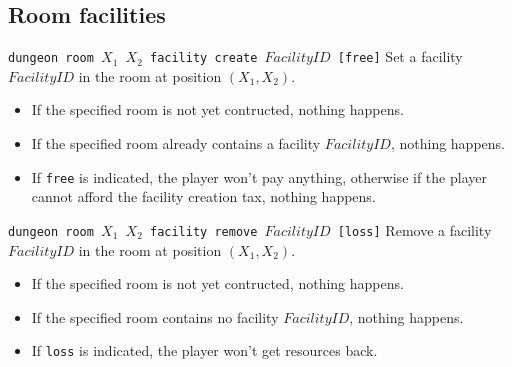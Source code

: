 \documentclass[10pt,a4paper]{scrartcl}
\newenvironment{apiCode}[1]
{ \begin{lrbox}{\mybox} \begin{minipage}{0.9\textwidth} {\color{Mahogany} \small\texttt{#1}} \vspace{8pt} \newline }
{ \end{minipage} \end{lrbox}\fbox{\usebox{\mybox}} \newline\vspace{4pt}\newline }
\begin{document}
\subsection{Room facilities}
\begin{apiCode}{dungeon room $X_1$ $X_2$ facility create $FacilityID$ [free]}
Set a facility $FacilityID$ in the room at position $(X_1, X_2)$.
\begin{itemize}
\itemsep 0em
\item If the specified room is not yet contructed, nothing happens.
\item If the specified room already contains a facility $FacilityID$, nothing happens.
\item If \verb#free# is indicated, the player won't pay anything,\newline
	  otherwise if the player cannot afford the facility creation tax, nothing happens.
\end{itemize}
\end{apiCode}
\begin{apiCode}{dungeon room $X_1$ $X_2$ facility remove $FacilityID$ [loss]}
Remove a facility $FacilityID$ in the room at position $(X_1, X_2)$.
\begin{itemize}
\itemsep 0em
\item If the specified room is not yet contructed, nothing happens.
\item If the specified room contains no facility $FacilityID$, nothing happens.
\item If \verb#loss# is indicated, the player won't get resources back.
\end{itemize}
\end{apiCode}
\end{document}
